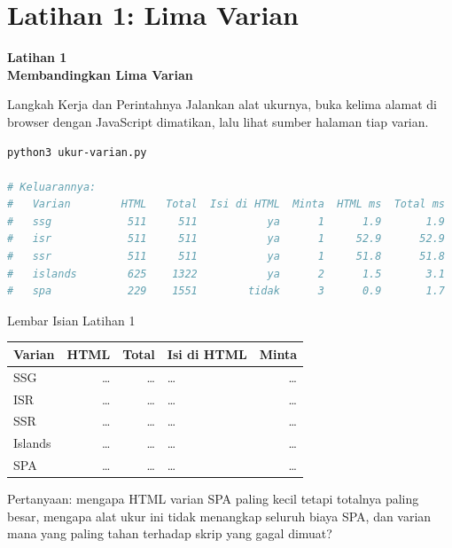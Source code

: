 \documentclass[aspectratio=169, table, 12pt]{beamer}
\begin{document}
\section{Latihan 1: Lima Varian}

\begin{frame}{\hfill}
  \centering
  \Huge{\textbf{Latihan 1\\Membandingkan Lima Varian}}
\end{frame}

\begin{frame}[fragile]{{\Large Langkah Kerja dan Perintahnya}}
  \vspace{2pt}
  {\footnotesize Jalankan alat ukurnya, buka kelima alamat di browser dengan
  JavaScript dimatikan, lalu lihat sumber halaman tiap varian.}
  \vspace{2pt}
\begin{lstlisting}[language=bash]
python3 ukur-varian.py

# Keluarannya:
#   Varian        HTML   Total  Isi di HTML  Minta  HTML ms  Total ms
#   ssg            511     511           ya      1      1.9       1.9
#   isr            511     511           ya      1     52.9      52.9
#   ssr            511     511           ya      1     51.8      51.8
#   islands        625    1322           ya      2      1.5       3.1
#   spa            229    1551        tidak      3      0.9       1.7
\end{lstlisting}
\end{frame}

\begin{frame}{{\Large Lembar Isian Latihan 1}}
  \vspace{6pt}
  \centering
  {\footnotesize
  \begin{tabularx}{\textwidth}{lrrlr}
    \hline
    \textbf{Varian} & \textbf{HTML} & \textbf{Total} & \textbf{Isi di HTML} & \textbf{Minta} \\
    \hline
    SSG & \dots & \dots & \dots & \dots \\
    \hline
    ISR & \dots & \dots & \dots & \dots \\
    \hline
    SSR & \dots & \dots & \dots & \dots \\
    \hline
    Islands & \dots & \dots & \dots & \dots \\
    \hline
    SPA & \dots & \dots & \dots & \dots \\
    \hline
  \end{tabularx}}

  \vspace{6pt}
  {\footnotesize Pertanyaan: mengapa HTML varian SPA paling kecil tetapi
  totalnya paling besar, mengapa alat ukur ini tidak menangkap seluruh biaya
  SPA, dan varian mana yang paling tahan terhadap skrip yang gagal dimuat?}
\end{frame}
\end{document}
